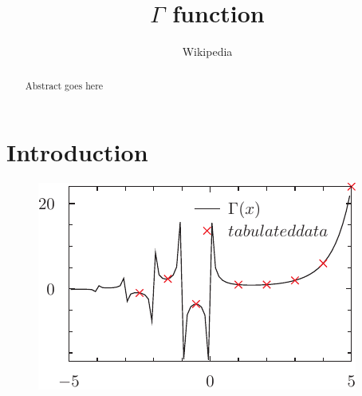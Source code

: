 \documentclass[twocolumn,a4paper]{article}
\begin{document}
\title{$\Gamma$ function}
\author{Wikipedia}
\maketitle
\begin{abstract}
Abstract goes here
\end{abstract}

\section{Introduction}
\begin{figure}[b]
	\includegraphics{gamma_pyx.pdf}
\end{figure}

\begin{figure}[b]
	
\end{figure}
\end{document}
